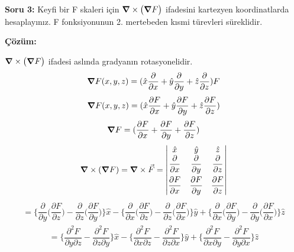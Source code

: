 \begin{flushleft}
   
	\textbf{Soru 3:} Keyfi bir F skaleri için $\grad \times \big(\grad F \big) $ ifadesini kartezyen koordinatlarda hesaplayınız. F fonksiyonunun 2. mertebeden kısmi türevleri süreklidir.

\end{flushleft}

  
   
	\textbf{Çözüm:} 

 $\grad \times \big(\grad F \big) $ ifadesi aslında gradyanın rotasyonelidir.
\begin{align}
    \grad F (x,y,z) = (  \hat{x} \dfrac{\partial}{\partial x} + \hat{y} \dfrac{\partial}{\partial y} + \hat{z} \dfrac{\partial}{\partial z} ) F
\end{align}
\begin{align}
    \grad F (x,y,z) = (  \hat{x} \dfrac{\partial F}{\partial x} + \hat{y} \dfrac{\partial F}{\partial y} + \hat{z} \dfrac{\partial F}{\partial z} ) 
\end{align}
 \begin{align}
    \grad F  = (  \dfrac{\partial F}{\partial x} +  \dfrac{\partial F}{\partial y} +  \dfrac{\partial F}{\partial z} ) 
\end{align}
\begin{align}
\grad  \times ( \grad F ) = \grad \times \Vec{F} =  
\begin{vmatrix}
 \hat{x} & \hat{y} & \hat{z} \\
 \dfrac{\partial}{\partial x} & \dfrac{\partial}{\partial y} & \dfrac{\partial}{\partial z} \\[2ex]
\dfrac{\partial F}{\partial x} & \dfrac{\partial F}{\partial y} & \dfrac{\partial F}{\partial z}
 \end{vmatrix}
\end{align}
\begin{align}
= \Big\{ \dfrac{\partial}{\partial y} \big( \dfrac{\partial F}{\partial z} \big) - \dfrac{\partial}{\partial z} \big( \dfrac{\partial F}{\partial y} \big) \Big\} \hat{x} - \Big\{ \dfrac{\partial}{\partial x} \big( \dfrac{\partial F}{\partial z} \big) - \dfrac{\partial}{\partial z} \big( \dfrac{\partial F}{\partial x} \big) \Big\} \hat{y} + \Big\{ \dfrac{\partial}{\partial x} \big( \dfrac{\partial F}{\partial y} \big) - \dfrac{\partial}{\partial y} \big( \dfrac{\partial F}{\partial x} \big) \Big\} \hat{z}
\end{align}
\begin{align}
= \Big\{ \dfrac{\partial^{2} F}{\partial y \partial z}  - \dfrac{\partial^{2} F}{\partial z \partial y} \Big\} \hat{x} - \Big\{ \dfrac{\partial^{2} F}{\partial x \partial z}  - \dfrac{\partial^{2} F}{\partial z \partial x} \Big\} \hat{y} + \Big\{ \dfrac{\partial^{2} F}{\partial x \partial y}  - \dfrac{\partial^{2} F}{\partial y \partial x} \Big\} \hat{z}
\end{align}
